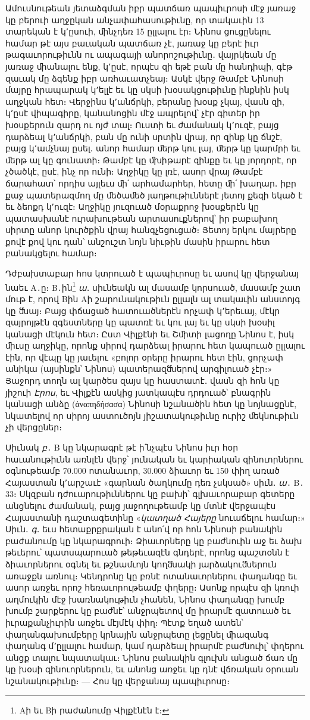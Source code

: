 \documentclass{article}
\begin{document}
{Ամուսնութեան յետաձգման իբր պատճառ պապիւրոսի մէջ յառաջ կը բերուի աղջըկան անչափահասութիւնը, որ տակաւին 13 տարեկան է կ՚ըսուի, ﬕնչդեռ 15 ըլլալու էր։ Նինոս ցուցընելու համար թէ այս բաւական պատճառ չէ, յառաջ կը բերէ իւր թագաւորութիւնն ու ապագայի անորոշութիւնը․ վայրկեան մը յառաջ ﬕանալու ենք, կ՚ըսէ, որպէս զի եթէ բան մը հանդիպի, գէթ զաւակ մը ձգենք իբր առհաւատչեայ։ Ասկէ վերջ Թամբէ Նինոսի մայրը հրապարակ կ՚ելլէ եւ կը սկսի խօսակցութիւնը ինքնին իսկ աղջկան հետ։ Վերջինս կ՚անճրկի, բերանը խօսք չկայ, վասն զի, կ՚ըսէ վիպագիրը, կանանոցին մէջ ապրելով՝ չէր գիտեր իր խօսքերուն զարդ ու ոյժ տալ։ Ուստի եւ ժամանակ կ՚ուզէ, բայց դարձեալ կ՚անճրկի, բան մը ունի սրտին վրայ, որ զինք կը ճնշէ, բայց կ՚ամչնայ ըսել․ անոր համար ﬔրթ կու լայ, ﬔրթ կը կարմրի եւ ﬔրթ ալ կը գունատի։ Թամբէ կը ﬗիթարէ զինքը եւ կը յորդորէ, որ չծածկէ, ըսէ, ինչ որ ունի։ Աղջիկը կը լռէ, ասոր վրայ Թամբէ ճարահատ՝ որդիս այլեւս ﬕ՛ արհամարհեր, հետը ﬕ՛ խաղար․ իբր քաջ պատերազմող մը ﬔծաﬔծ յաղթութիւններէ յետոյ քեզի եկած է եւ ձեոքդ կ՚ուզէ։ Աղջիկը յուզուած մօրաքրոջ խօսքերէն կը պատասխանէ ուրախութեան արտասուքներով՝ իր բաբախող սիրտը անոր կուրծքին վրայ հանգչեցուցած։ Յետոյ երկու մայրերը քովէ քով կու դան՝ անշուշտ նոյն նիւթին մասին իրարու հետ բանակցելու համար։

Դժբախտաբար հոս կտրուած է պապիւրոսը եւ ասով կը վերջանայ նաեւ Α․ը։ Β․ին\footnote{Αի եւ Βի րաժանումը Վիլքէնէն է։} \emph{ա}․ սիւնեակն ալ մասամբ կորսուած, մասամբ շատ մութ է, որով Βին Αի շարունակութիւն ըլլալն ալ տակաւին անստոյգ կը ﬓայ։ Բայց փճացած հատուածներէն որչափ կ՚երեւայ, մէկր զայրոյթէն զգեստները կը պատռէ եւ կու լայ եւ կը սկսի խօսիլ կանացի մէկուն հետ։ Ըստ Վիլքէնի եւ Շﬕտի լացողը Նինոս է, իսկ ﬕւսը աղջիկը, որոնք սիրով դարձեալ իրարու հետ կապուած ըլլալու էին, որ վէպը կը յաւելու «բոլոր օրերը իրարու հետ էին, ցորչափ անիկա (այսինքն՝ Նինոս) պատերազﬓերով արգիլուած չէր։» Յաջորդ տողն ալ կարծես զայս կը հաստատէ․ վասն զի հոն կը յիշուի \emph{Էրոս}, եւ Վիլքէն ասկից յատկապէս դրդուած՝ բնագրին կանացի անձը (ἀναπηδήσασα) Նինոսի նշանածին հետ կը նոյնացընէ, նկատելով որ սիրոյ աստուծոյն յիշատակութիւնը ուրիշ ﬔկնութիւն չի վերցըներ։

Սիւնակ \emph{բ}․ Β կը նկարագրէ թէ ի՛նչպէս Նինոս իւր հօր հաւանութիւնն առնլէն վերջ՝ յունական եւ կարիական զինուորներու օգնութեամբ 70.000 ոտանաւոր, 30.000 ձիաւոր եւ 150 փիղ առած Հայաստան կ՚արշաւէ «գարնան ծաղկումը դեռ չսկսած» սիւն․ \emph{ա}․ Β․ 33։ Սկզբան դժուարութիւններու կը բախի՝ գլխաւորաբար գետերը անցնելու ժամանակ, բայց յաջողութեամբ կը մտնէ վերջապէս Հայաստանի դաշտագետինը «\emph{կատղած Հայերը} նուաճելու համար։» Սիւն․ \emph{գ}․ եւս հետաքրքրական է անո՛վ որ հոն Նինոսի բանակին բաժանումը կը նկարագրուի։ Ձիաւորները կը բաժնուին աջ եւ ձախ թեւերու՝ պատսպարուած թեթեւազէն գնդերէ, որոնց պաշտօնն է ձիաւորներու օգնել եւ թշնամւոյն կողﬓակի յարձակուﬓերուն առաջքն առնուլ։ Կենդրոնը կը բռնէ ոտանաւորներու փաղանգը եւ ասոր առջեւ որոշ հեռաւորութեամբ փղերը։ Ասոնք որպէս զի կռուի աղմուկին մէջ խառնակութիւն չհանեն, Նինոս փաղանգը խումբ խումբ շարքերու կը բաժնէ՝ անջրպետով մը իրարմէ զատուած եւ իւրաքանչիւրին առջեւ մէյմէկ փիղ։ Պէտք եղած ատեն՝ փաղանգախումբերը կրնային անջրպետը լեցընել ﬕազանգ փաղանգ մ՚ըլլալու համար, կամ դարձեալ իրարմէ բաժնուիլ՝ փղերու անցք տալու նպատակաւ։ Նինոս բանակին գլուխն անցած ճառ մը կը խօսի զինուորներուն, եւ անոնց առջեւ կը դնէ վճռական օրուան նշանակութիւնը։ — Հոս կը վերջանայ պապիւրոսը։

}
\end{document}
